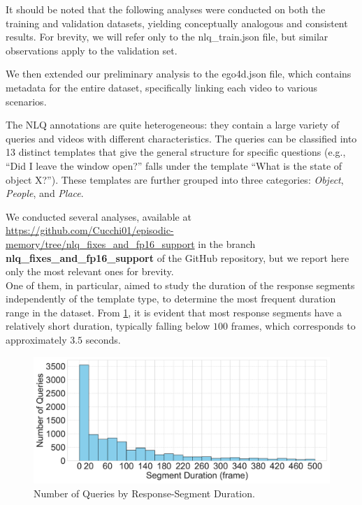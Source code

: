 \documentclass[10pt,twocolumn,letterpaper]{article}
\begin{document}
It should be noted that the following analyses were conducted on both the training and validation datasets, yielding conceptually analogous and consistent results. For brevity, we will refer only to the nlq\_train.json file, but similar observations apply to the validation set.

We then extended our preliminary analysis to the ego4d.json file, which contains metadata for the entire dataset, specifically linking each video to various scenarios.

The NLQ annotations are quite heterogeneous: they contain a large variety of queries and videos with different characteristics. The queries can be classified into 13 distinct templates that give the general structure for specific questions (e.g., “Did I leave the window open?” falls under the template “What is the state of object X?”). These templates are further grouped into three categories: \textit{Object}, \textit{People}, and \textit{Place}.

We conducted several analyses, available at \url{https://github.com/Cucchi01/episodic-memory/tree/nlq_fixes_and_fp16_support} in the branch \textbf{nlq\_fixes\_and\_fp16\_support} of the GitHub repository, but we report here only the most relevant ones for brevity.  \\
One of them, in particular, aimed to study the duration of the response segments independently of the template type, to determine the most frequent duration range in the dataset.
From \cref{fig:5}, it is evident that most response segments have a relatively short duration, typically falling below \(100\) frames, which corresponds to approximately \(3.5\) seconds.

\begin{figure}[h]
    \centering
    \includegraphics[width=1\linewidth]{images/NumberQueriesByResponseDuration_large_font.pdf}
    \caption{Number of Queries by Response-Segment Duration.}
    \label{fig:5}
\end{figure}
\end{document}
